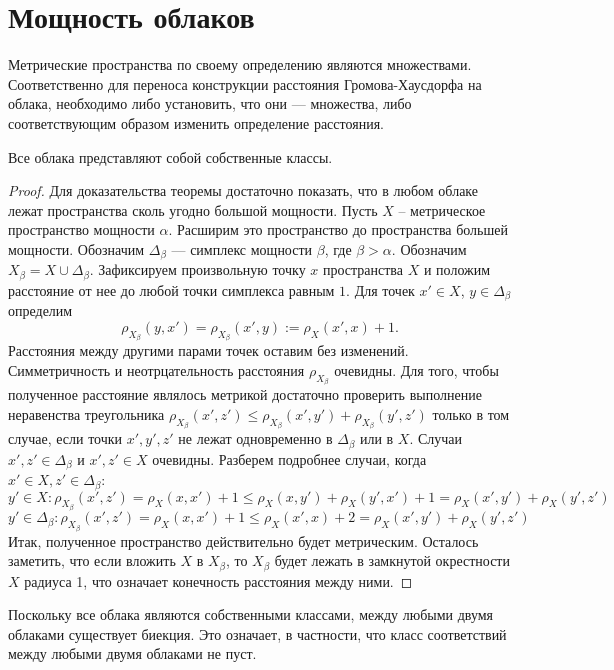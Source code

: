 \section{Мощность облаков}
Метрические пространства по своему определению являются множествами.
Соответственно для переноса конструкции расстояния Громова-Хаусдорфа на облака,
необходимо либо установить, что они --- множества, либо \\ соответствующим
образом изменить определение расстояния.
    \begin{theorem} Все облака представляют собой собственные классы.
	\end{theorem}
	\begin{proof} Для доказательства теоремы достаточно показать, что в любом
облаке лежат пространства сколь угодно большой мощности.  Пусть $X$ --
метрическое пространство мощности $\alpha$. Расширим это пространство до
пространства большей мощности. Обозначим $\Delta_\beta$ --- симплекс мощности
$\beta$, где $\beta > \alpha$. Обозначим $X_\beta = X \cup \Delta_\beta$.
Зафиксируем произвольную точку $x$ пространства $X$ и положим расстояние от нее
до любой точки симплекса равным $1$. Для точек $x' \in X$,
$y \in \Delta_\beta$ определим
$$\rho_{X_\beta}(y,x') = \rho_{X_\beta}(x',y) := \rho_X(x',x) + 1.$$
Расстояния между другими парами точек оставим без изменений.
Симметричность и неотрцательность расстояния $\rho_{X_{\beta}}$ очевидны.
Для того, чтобы
полученное расстояние являлось метрикой достаточно проверить выполнение
неравенства треугольника
$\rho_{X_\beta}(x',z') \le \rho_{X_\beta}(x',y') +\rho_{X_\beta}(y',z')$
только в том случае, если точки $x', y', z'$ не лежат одновременно в
$\Delta_\beta$ или в $X$. Случаи $x', z' \in \Delta_\beta$ и $ x', z' \in X$
очевидны. Разберем подробнее случаи, когда $x' \in X, z' \in \Delta_\beta$:
		$$ y' \in X: \rho_{X_\beta}(x', z') = \rho_X(x,x') + 1 \le \rho_X(x,y') + \rho_X(y',x') + 1 = \rho_X(x',y') + \rho_X(y',z')$$
		$$y' \in \Delta_\beta: \rho_{X_\beta}(x', z') = \rho_X(x,x') + 1 \le \rho_X(x',x) + 2 = \rho_X(x',y') + \rho_X(y',z')$$
		Итак, полученное пространство действительно будет метрическим. Осталось
заметить, что если вложить $X$ в $X_\beta$, то $X_\beta$ будет лежать в
замкнутой окрестности $X$ радиуса 1, что означает конечность расстояния между
ними.
 	 \end{proof}

 	 \begin{remark} Поскольку все облака являются собственными классами, между
любыми двумя облаками существует биекция. Это означает, в частности, что класс соответствий между любыми двумя облаками не пуст.
 	 \end{remark}

